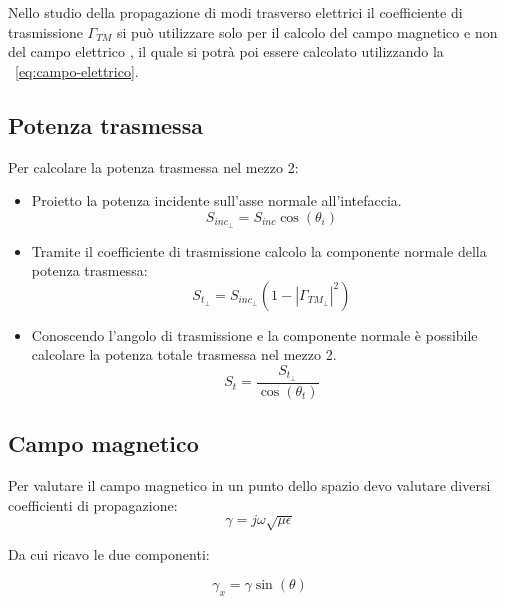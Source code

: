 \documentclass[10pt,a4paper]{report}
\begin{document}
			 Nello studio della propagazione di modi trasverso elettrici il coefficiente di trasmissione $\Gamma_{TM}$ si può utilizzare solo per il calcolo del campo magnetico e non del campo elettrico , il quale si potrà poi essere calcolato utilizzando la ~\ref{eq:campo-elettrico}.

		\subsection{Potenza trasmessa}

			Per calcolare la potenza trasmessa nel mezzo 2:
			
			\begin{itemize}
			
			\item Proietto la potenza incidente sull'asse normale all'intefaccia.
			\begin{equation}
			S_{inc_\perp}=S_{inc}\cos(\theta_i)
			\end{equation}

			\item Tramite il coefficiente di trasmissione calcolo la componente normale della potenza trasmessa:
			\begin{equation}
			S_{t_\perp}=S_{inc_\perp}(1-|\Gamma_{TM_\perp}|^2)
			\end{equation}

			\item Conoscendo l'angolo di trasmissione e la componente normale è possibile calcolare la potenza totale trasmessa nel mezzo 2.
			\begin{equation}
			S_{t}=\frac{S_{t_\perp}}{\cos(\theta_t)}
			\end{equation}
			

			\end{itemize}
		

		\subsection{Campo magnetico}

			Per valutare il campo magnetico in un punto dello spazio devo valutare diversi coefficienti di propagazione:
			\begin{equation}
			\gamma=j\omega\sqrt{\mu\epsilon}\end{equation}

			Da cui ricavo le due componenti:

			\begin{equation}
			\gamma_x=\gamma\sin(\theta)
			\end{equation}
\end{document}
